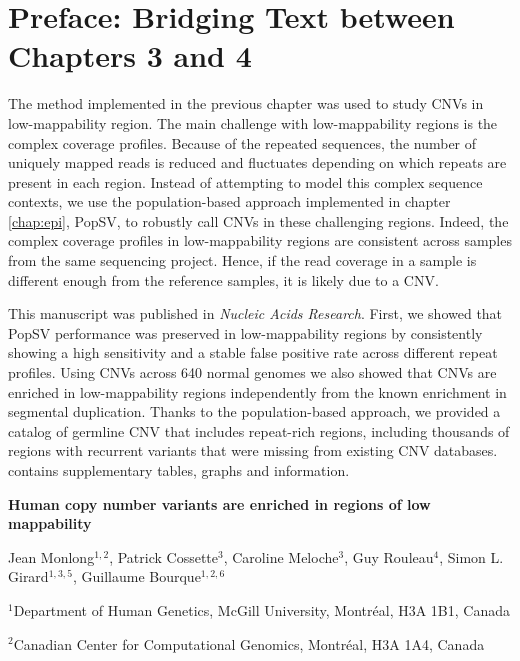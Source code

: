\section*{Preface: Bridging Text between Chapters 3 and 4}


The method implemented in the previous chapter was used to study CNVs in low-mappability region.
The main challenge with low-mappability regions is the complex coverage profiles.
Because of the repeated sequences, the number of uniquely mapped reads is reduced and fluctuates depending on which repeats are present in each region.
Instead of attempting to model this complex sequence contexts, we use the population-based approach implemented in chapter \ref{chap:epi}, {\sf PopSV}, to robustly call CNVs in these challenging regions.
Indeed, the complex coverage profiles in low-mappability regions are consistent across samples from the same sequencing project.
Hence, if the read coverage in a sample is different enough from the reference samples, it is likely due to a CNV.

This manuscript was published in {\it Nucleic Acids Research}\cite{Monlong2018nar}.
First, we showed that {\sf PopSV} performance was preserved in low-mappability regions by consistently showing a high sensitivity and a stable false positive rate across different repeat profiles.
Using CNVs across 640 normal genomes we also showed that CNVs are enriched in low-mappability regions independently from the known enrichment in segmental duplication.
Thanks to the population-based approach, we provided a catalog of germline CNV that includes repeat-rich regions, including thousands of regions with recurrent variants that were missing from existing CNV databases.
 contains supplementary tables, graphs and information.

\newpage
\singlespacing

\begin{center}
  \LARGE\bf Human copy number variants are enriched in regions of low mappability
\end{center}
\bigskip

\large{Jean Monlong$^{1,2}$, Patrick Cossette$^{3}$, Caroline Meloche$^3$, Guy Rouleau$^4$, Simon L. Girard$^{1,3,5}$, Guillaume Bourque$^{1,2,6}$}
\bigskip

\footnotesize
$^1$Department of Human Genetics, McGill University, Montr\'eal, H3A 1B1, Canada

$^2$Canadian Center for Computational Genomics, Montr\'eal, H3A 1A4, Canada

